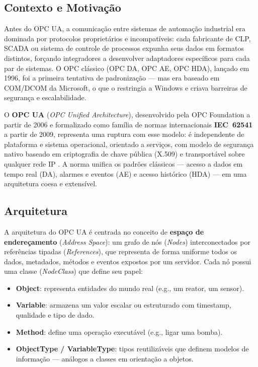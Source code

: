 \subsection{Contexto e Motivação}

Antes do OPC UA, a comunicação entre sistemas de automação industrial era dominada por protocolos proprietários e incompatíveis: cada fabricante de CLP, SCADA ou sistema de controle de processos expunha seus dados em formatos distintos, forçando integradores a desenvolver adaptadores específicos para cada par de sistemas. O OPC clássico (OPC DA, OPC AE, OPC HDA), lançado em 1996, foi a primeira tentativa de padronização — mas era baseado em COM/DCOM da Microsoft, o que o restringia a Windows e criava barreiras de segurança e escalabilidade.

O \textbf{OPC UA} (\textit{OPC Unified Architecture}), desenvolvido pela OPC Foundation a partir de 2006 e formalizado como família de normas internacionais \textbf{IEC~62541} a partir de 2009, representa uma ruptura com esse modelo: é independente de plataforma e sistema operacional, orientado a serviços, com modelo de segurança nativo baseado em criptografia de chave pública (X.509) e transportável sobre qualquer rede IP \cite{OPCUA2017}. A norma unifica os padrões clássicos — acesso a dados em tempo real (DA), alarmes e eventos (AE) e acesso histórico (HDA) — em uma arquitetura coesa e extensível.

\subsection{Arquitetura}

A arquitetura do OPC UA é centrada no conceito de \textbf{espaço de endereçamento} (\textit{Address Space}): um grafo de nós (\textit{Nodes}) interconectados por referências tipadas (\textit{References}), que representa de forma uniforme todos os dados, metadados, métodos e eventos expostos por um servidor. Cada nó possui uma classe (\textit{NodeClass}) que define seu papel:

\begin{itemize}
  \item \textbf{Object}: representa entidades do mundo real (e.g., um reator, um sensor).
  \item \textbf{Variable}: armazena um valor escalar ou estruturado com timestamp, qualidade e tipo de dado.
  \item \textbf{Method}: define uma operação executável (e.g., ligar uma bomba).
  \item \textbf{ObjectType / VariableType}: tipos reutilizáveis que definem modelos de informação — análogos a classes em orientação a objetos.
\end{itemize}

